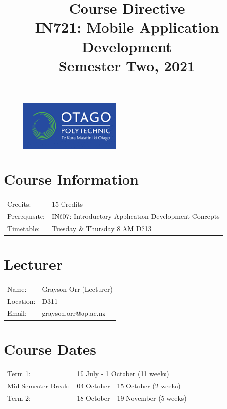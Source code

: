 \documentclass{article}
\author{}
\begin{document}
 

\begin{figure}
	\includegraphics[width=50mm]{../../resources/img/logo.png}
\end{figure} 

\title{Course Directive\\IN721: Mobile Application Development\\Semester Two, 2021}
\date{}
\maketitle

\section*{Course Information}
\begin{tabular}{ll}
	Credits:                      & 15 Credits                                                                   \\
	Prerequisite:                 & IN607: Introductory Application Development Concepts \\
	Timetable:  & Tuesday \& Thursday 8 AM D313                                                         \\
\end{tabular}

\section*{Lecturer}
\begin{tabular}{ll}
	Name:     & Grayson Orr (Lecturer) \\
	Location: & D311                   \\
	Email:    & grayson.orr@op.ac.nz   \\
\end{tabular}

\section*{Course Dates}
\begin{tabular}{ll}
	Term 1:             & 19 July - 1 October (11 weeks) \\
	Mid Semester Break: & 04 October - 15 October (2 weeks)    \\
	Term 2:             & 18 October - 19 November (5 weeks)        \\     
\end{tabular}
\end{document}
